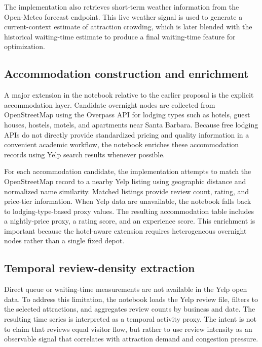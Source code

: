 \documentclass[12pt,a4paper]{article}
\begin{document}
The implementation also retrieves short-term weather information from the Open-Meteo forecast endpoint. This live weather signal is used to generate a current-context estimate of attraction crowding, which is later blended with the historical waiting-time estimate to produce a final waiting-time feature for optimization.

\subsection{Accommodation construction and enrichment}

A major extension in the notebook relative to the earlier proposal is the explicit accommodation layer. Candidate overnight nodes are collected from OpenStreetMap \cite{openstreetmap} using the Overpass API \cite{overpass_api} for lodging types such as hotels, guest houses, hostels, motels, and apartments near Santa Barbara. Because free lodging APIs do not directly provide standardized pricing and quality information in a convenient academic workflow, the notebook enriches these accommodation records using Yelp search results whenever possible.

For each accommodation candidate, the implementation attempts to match the OpenStreetMap record to a nearby Yelp listing using geographic distance and normalized name similarity. Matched listings provide review count, rating, and price-tier information. When Yelp data are unavailable, the notebook falls back to lodging-type-based proxy values. The resulting accommodation table includes a nightly-price proxy, a rating score, and an experience score. This enrichment is important because the hotel-aware extension requires heterogeneous overnight nodes rather than a single fixed depot.

\subsection{Temporal review-density extraction}

Direct queue or waiting-time measurements are not available in the Yelp open data. To address this limitation, the notebook loads the Yelp review file, filters to the selected attractions, and aggregates review counts by business and date. The resulting time series is interpreted as a temporal activity proxy. The intent is not to claim that reviews equal visitor flow, but rather to use review intensity as an observable signal that correlates with attraction demand and congestion pressure.
\end{document}
